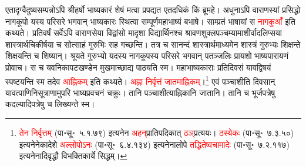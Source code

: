 \begin{sloppypar}\justifying\noindent एतादृग्वैदुष्य\-सम्पन्नोऽपि श्रीहर्षो भाष्यकारं शेषं मत्वा प्रपद्यत एतदधिकं किं ब्रूमहे। अधुनाऽपि वाराणस्यां प्रसिद्धो नागकूपो यस्य परिसरे भगवान् भाष्यकारः स्थित्वा सम्पूर्ण\-महा\-भाष्यं बभाषे। साम्प्रतं भाषायां स \textcolor{red}{नागकुआँ} इति कथ्यते। प्रतिवर्षं सर्वेऽपि वाराणसेया विद्वांसो मादृशा विद्यार्थिनश्च श्रावण\-शुक्ल\-पञ्चम्यामाशीर्वाद\-लिप्सया शास्त्रार्थ\-चिकीर्षया च सोत्साहं गुरुभिः सह गच्छन्ति। तत्र च सानन्दं शास्त्रार्थ\-माध्यमेन शास्त्रं गुरुभ्यः शिक्षन्ते शिक्षयन्ति च शिष्यान्। श्रूयते गुरुभ्यो यदस्य नाग\-कूपस्य परिसरे भगवान् पतञ्जलिः प्रायशो भाष्य\-पारायणं प्रोवाच। स च यवनिका\-पट\-खण्डेन मुखमाच्छाद्य पाठयति स्म। महाभाष्यकाराः प्रतिदिवसं यावद्विषयं स्पष्टयन्ति स्म तदेव \textcolor{red}{आह्निकम्} इति कथ्यते। \textcolor{red}{अह्ना निर्वृत्तं जातमाह्निकम्}।\footnote{\textcolor{red}{तेन निर्वृत्तम्} (पा॰सू॰~५.१.७९) इत्यनेन \textcolor{red}{अहन्‌}\-प्रातिपदिकात् \textcolor{red}{ठञ्‌}\-प्रत्ययः। \textcolor{red}{ठस्येकः} (पा॰सू॰~७.३.५०) इत्यनेनेकादेशे \textcolor{red}{अल्लोपोऽनः} (पा॰सू॰~६.४.१३४) इत्यनेनालोपे \textcolor{red}{तद्धितेष्वचामादेः} (पा॰सू॰~७.२.११७) इत्यनेनादि\-वृद्धौ विभक्ति\-कार्ये सिद्धम्।} एवं पञ्चाशीति दिवसान् यावत्पाणिनि\-सूत्राणामुपरि भाष्य\-प्रवचनं चक्रुः। तानि पञ्चाशीत्याह्निकानि जातानि। तानि च भूर्जपत्रेषु कदल्यादिपत्रेषु च लिख्यन्ते स्म।

\end{sloppypar}
